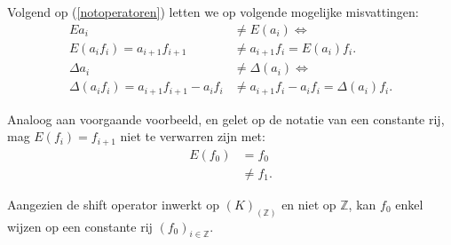 \documentclass[a4paper,12pt]{article}
\begin{document}
\begin{example}
    Volgend op (\ref{notoperatoren}) letten we op volgende mogelijke misvattingen:
    \begin{align*}
        E a_i                                       & \neq E(a_i) \Leftrightarrow                 \\
        E(a_i f_i) = a_{i+1}f_{i+1}                 & \neq a_{i+1} f_i = E(a_i) f_i.              \\
        \Delta a_i                                  & \neq \Delta(a_i) \Leftrightarrow            \\
        \Delta(a_i f_i) = a_{i+1} f_{i+1} - a_i f_i & \neq a_{i+1} f_i - a_i f_i=\Delta(a_i) f_i.
    \end{align*}


\end{example}

\begin{example}
    Analoog aan voorgaande voorbeeld, en gelet op de notatie van een constante rij, mag $E(f_i) = f_{i+1}$ niet te verwarren zijn met:
    \begin{align*}
        E(f_0) & = f_0     \\
               & \neq f_1.
    \end{align*}

    Aangezien de shift operator inwerkt op $(K)_\mathbb{(Z)}$ en niet op $\mathbb{Z}$, kan $f_0$ enkel wijzen op een constante rij $(f_0)_{i \in \mathbb{Z}}$.
\end{example}
\end{document}
